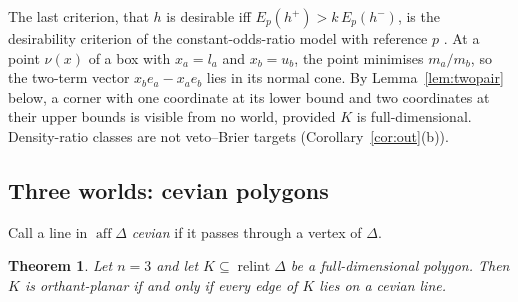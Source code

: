 \documentclass[11pt]{article}
\DeclareMathOperator{\relint}{relint}
\DeclareMathOperator{\aff}{aff}
\theoremstyle{plain}
\newtheorem{theorem}{Theorem}[section]
\theoremstyle{definition}
\theoremstyle{remark}
\begin{document}
The last criterion, that $h$ is desirable iff $E_p(h^+)>k\,E_p(h^-)$, is the desirability
criterion of the constant-odds-ratio model with reference $p$ \cite{Walley}. At a point
$\nu(x)$ of a box with $x_a=l_a$ and $x_b=u_b$, the point minimises $m_a/m_b$, so the
two-term vector $x_be_a-x_ae_b$ lies in its normal cone. By Lemma~\ref{lem:twopair} below,
a corner with one coordinate at its lower bound and two coordinates at their upper bounds
is visible from no world, provided $K$ is full-dimensional. Density-ratio classes are not
veto--Brier targets (Corollary~\ref{cor:out}(b)).

\subsection{Three worlds: cevian polygons}

Call a line in $\aff\Delta$ \emph{cevian} if it passes through a vertex of $\Delta$.

\begin{theorem}\label{thm:cevian}
Let $n=3$ and let $K\subseteq\relint\Delta$ be a full-dimensional polygon. Then $K$ is
orthant-planar if and only if every edge of $K$ lies on a cevian line.
\end{theorem}
\end{document}
